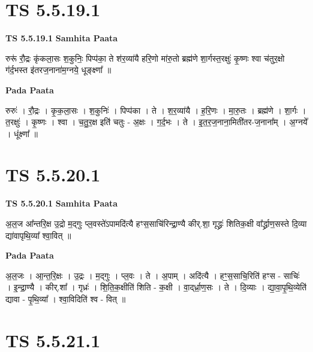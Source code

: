 \documentclass[17pt]{extarticle}
\begin{document}
\section*{ TS 5.5.19.1 }

\textbf{TS 5.5.19.1 } \newline
\textbf{Samhita Paata} \newline

रुरू॑ रौ॒द्रः कृ॑कला॒सः श॒कुनिः॒ पिप्प॑का॒ ते श॑र॒व्या॑यै हरि॒णो मा॑रु॒तो ब्रह्म॑णे शा॒र्गस्त॒रक्षुः॑ कृ॒ष्णः श्वा च॑तुर॒क्षो ग॑र्द॒भस्त इ॑तरज॒नाना॑म॒ग्नये॒ धूङ्क्ष्णा᳚ ॥ \newline

\textbf{Pada Paata} \newline

रुरुः॑ । रौ॒द्रः । कृ॒क॒ला॒सः । श॒कुनिः॑ । पिप्प॑का । ते । श॒र॒व्या॑यै । ह॒रि॒णः । मा॒रु॒तः । ब्रह्म॑णे । शा॒र्गः । त॒रक्षुः॑ । कृ॒ष्णः । श्वा । च॒तु॒र॒क्ष इति॑ चतुः - अ॒क्षः । ग॒र्द॒भः । ते । इ॒त॒र॒ज॒नाना॒मिती॑तर-ज॒नाना᳚म् । अ॒ग्नये᳚ । धूंक्ष्णा᳚ ॥  \newline




\section*{ TS 5.5.20.1 }

\textbf{TS 5.5.20.1 } \newline
\textbf{Samhita Paata} \newline

अ॒ल॒ज आ᳚न्तरि॒क्ष उ॒द्रो म॒द्गुः प्ल॒वस्ते॑ऽपामदि॑त्यै हꣳस॒साचि॑रिन्द्रा॒ण्यै कीर्.शा॒ गृद्ध्रः॑ शितिक॒क्षी वा᳚र्द्ध्राण॒सस्ते दि॒व्या द्या॑वापृथि॒व्या᳚ श्वा॒वित् ॥ \newline

\textbf{Pada Paata} \newline

अ॒ल॒जः । आ॒न्त॒रि॒क्षः । उ॒द्रः । म॒द्गुः । प्ल॒वः । ते । अ॒पाम् । अदि॑त्यै । हꣳ॒॒स॒साचि॒रिति॑ हꣳस - साचिः॑ । इ॒न्द्रा॒ण्यै । कीर्.शा᳚ । गृध्रः॑ । शि॒ति॒क॒क्षीति॑ शिति - क॒क्षी । वा॒द्‌र्ध्रा॒ण॒सः । ते । दि॒व्याः । द्या॒वा॒पृ॒थि॒व्येति॑ द्यावा - पृ॒थि॒व्या᳚ । श्वा॒विदिति॑ श्व - वित् ॥  \newline




\section*{ TS 5.5.21.1 }
\end{document}
